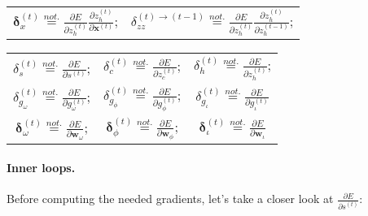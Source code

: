 \documentclass[11pt]{article}
\begin{document}
\begin{center}
\begin{tabular}{c c}
    $\boldsymbol{\delta}_{x}^{(t)} \overset{not.}{=} \displaystyle\frac{\partial E}{\partial z_h^{(t)}}\displaystyle\frac{\partial z_h^{(t)}} {\partial \mathbf{x}^{(t)}}$; &
    $\delta_{zz}^{(t)\rightarrow(t-1)} \overset{not.}{=} \displaystyle\frac{\partial E}{\partial z_h^{(t)}}\displaystyle\frac{\partial z_h^{(t)}} {\partial z_h^{(t-1)}}$; \\[20pt]
\end{tabular}
\begin{tabular}{c c c}
    $\delta_{s}^{(t)} \overset{not.}{=} \displaystyle\frac{\partial E}{\partial s^{(t)}}$; &
    $\delta_{c}^{(t)} \overset{not.}{=} \displaystyle\frac{\partial E}{\partial z_c^{(t)}}$; &
    $\delta_{h}^{(t)} \overset{not.}{=} \displaystyle\frac{\partial E}{\partial z_h^{(t)}}$;  \\[20pt]
    $\delta_{g_{\omega}}^{(t)} \overset{not.}{=} \displaystyle\frac{\partial E}{\partial g_{\omega}^{(t)}}$; &
    $\delta_{g_{\phi}}^{(t)} \overset{not.}{=} \displaystyle\frac{\partial E}{\partial g_{\phi}^{(t)}}$; &
    $\delta_{g_{\iota}}^{(t)} \overset{not.}{=} \displaystyle\frac{\partial E}{\partial g_{\iota}^{(t)}}$ \\[20pt]
    $\boldsymbol{\delta}_{\omega}^{(t)} \overset{not.}{=} \displaystyle\frac{\partial E}{\partial \mathbf{w}_{\omega}}$; &
    $\boldsymbol{\delta}_{\phi}^{(t)} \overset{not.}{=} \displaystyle\frac{\partial E}{\partial \mathbf{w}_{\phi}}$; &
    $\boldsymbol{\delta}_{\iota}^{(t)} \overset{not.}{=} \displaystyle\frac{\partial E}{\partial \mathbf{w}_{\iota}}$
\end{tabular}
\end{center}

\paragraph{Inner loops.} Before computing the needed gradients, let's take a closer look at $\displaystyle \frac{\partial E}{\partial s^{(t)}}$:
\end{document}
